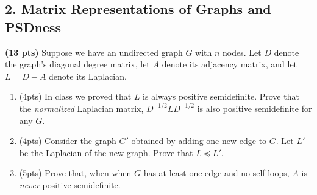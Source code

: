 \documentclass[10pt]{article}
\begin{document}
	
	



\subsection{2. Matrix Representations of Graphs and PSDness}

\textbf{(13 pts)} Suppose we have an undirected graph $G$ with $n$ nodes. Let $D$ denote the graph's diagonal degree matrix, let $A$ denote its adjacency matrix, and let $L = D-A$ denote its Laplacian.
\begin{enumerate}[label=(\alph*)]		
	\item (4pts) In class we proved that $L$ is always positive semidefinite. Prove that the \emph{normalized} Laplacian matrix, $D^{-1/2} L D^{-1/2}$ is also positive semidefinite for any $G$.\vspace{20em}
	
	\item (4pts) Consider the graph $G'$ obtained by adding one new edge to $G$. Let $L'$ be the Laplacian of the new graph. Prove that $L \preceq L'$.\vspace{20em}
	
	\item (5pts) Prove that, when when $G$ has at least one edge and \underline{no self loops}, $A$ is \emph{never} positive semidefinite.


\end{enumerate}

\newpage
\end{document}

